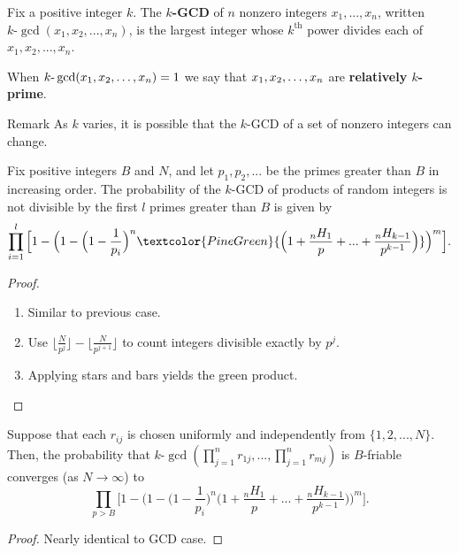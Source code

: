 \documentclass[11pt,xcolor={dvipsnames}]{beamer}
\begin{document}
	\begin{frame}
		\begin{definition} Fix a positive integer $k$. The \textbf{$k$-GCD} of $n$ nonzero integers $x_1, ..., x_n$, written $k\text{-}\gcd(x_1,x_2, ...,x_n)$, is the largest integer whose $k^{\text{th}}$ power divides each of $x_1, x_2, ..., x_n$.
		\end{definition}	
	
		\begin{definition} When $k\text{-}\gcd(x_1,x_2,\mathellipsis,x_n)=1$ we say that  $x_1,x_2,\mathellipsis,x_n$ are \textbf{relatively $k$-prime}.
		\end{definition}
		
		\begin{alertblock}{Remark}
			As $k$ varies, it is possible that the $k$-GCD of a set of nonzero integers can change. 
		\end{alertblock}

	\end{frame}

	\begin{frame}
		\begin{theorem}
			Fix positive integers $B$ and $N$, and let $p_1, p_2, ...$ be the primes greater than $B$ in increasing order. The probability of the $k$-GCD of products of random integers is not divisible by the first $l$ primes greater than $B$ is given by 
			$$\prod_{i=1}^{l} \Big[1 - \Big(1 - \Big(1-\frac{1}{p_i}\Big)^n \textcolor{PineGreen}{\Big(1 + \frac{{}_nH_1}{p} + ... + \frac{{}_nH_{k-1}}{p^{k-1}}\Big)}\Big)^m\Big].$$
		\end{theorem}
	
		\begin{proof}
			\begin{enumerate}
				\item Similar to previous case.
				\item Use
				$\Big\lfloor\frac{N}{p^j}\Big\rfloor - \Big\lfloor\frac{N}{p^{j+1}}\Big\rfloor$ to count integers divisible exactly by $p^j$.
				\item Applying stars and bars yields the \textcolor{PineGreen}{green product}.
			\end{enumerate}
		\end{proof}
	\end{frame}

	\begin{frame}
		\begin{theorem} Suppose that each $r_{ij}$ is chosen uniformly and independently from $\{1, 2, ..., N\}$. Then, the probability that $k\text{-}\gcd(\prod_{j=1}^n r_{1j}, ... , \prod_{j=1}^n r_{mj})$ is $B$-friable converges (as $N \to \infty$) to
			$$\prod_{p>B} \Big[1 - \Big(1 - \Big(1-\frac{1}{p_i}\Big)^n \Big(1 + \frac{{}_nH_1}{p} + ... + \frac{{}_nH_{k-1}}{p^{k-1}}\Big)\Big)^m\Big].$$
		\end{theorem}
	
		\begin{proof}
			Nearly identical to GCD case.
		\end{proof}
	\end{frame}
\end{document}
